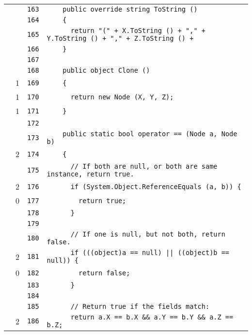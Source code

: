 \documentclass[a4paper,10pt]{article}
\begin{document}
\begin{longtable}[l]{lrrl}
\cellcolor{gray} &  & \verb~163~ & \verb~    public override string ToString ()~\\
\cellcolor{gray} &  & \verb~164~ & \verb~    {~\\
\cellcolor{gray} &  & \verb~165~ & \verb~      return "(" + X.ToString () + "," + Y.ToString () + "," + Z.ToString () +~\\
\cellcolor{gray} &  & \verb~166~ & \verb~    }~\\
\cellcolor{gray} &  & \verb~167~ & \verb~~\\
\cellcolor{gray} &  & \verb~168~ & \verb~    public object Clone ()~\\
\cellcolor{green} & 1 & \verb~169~ & \verb~    {~\\
\cellcolor{green} & 1 & \verb~170~ & \verb~      return new Node (X, Y, Z);~\\
\cellcolor{green} & 1 & \verb~171~ & \verb~    }~\\
\cellcolor{gray} &  & \verb~172~ & \verb~~\\
\cellcolor{gray} &  & \verb~173~ & \verb~    public static bool operator == (Node a, Node b)~\\
\cellcolor{green} & 2 & \verb~174~ & \verb~    {~\\
\cellcolor{gray} &  & \verb~175~ & \verb~      // If both are null, or both are same instance, return true.~\\
\cellcolor{green} & 2 & \verb~176~ & \verb~      if (System.Object.ReferenceEquals (a, b)) {~\\
\cellcolor{red} & 0 & \verb~177~ & \verb~        return true;~\\
\cellcolor{gray} &  & \verb~178~ & \verb~      }~\\
\cellcolor{gray} &  & \verb~179~ & \verb~~\\
\cellcolor{gray} &  & \verb~180~ & \verb~      // If one is null, but not both, return false.~\\
\cellcolor{green} & 2 & \verb~181~ & \verb~      if (((object)a == null) || ((object)b == null)) {~\\
\cellcolor{red} & 0 & \verb~182~ & \verb~        return false;~\\
\cellcolor{gray} &  & \verb~183~ & \verb~      }~\\
\cellcolor{gray} &  & \verb~184~ & \verb~~\\
\cellcolor{gray} &  & \verb~185~ & \verb~      // Return true if the fields match:~\\
\cellcolor{green} & 2 & \verb~186~ & \verb~      return a.X == b.X && a.Y == b.Y && a.Z == b.Z;~\\

\end{longtable}
\end{document}
